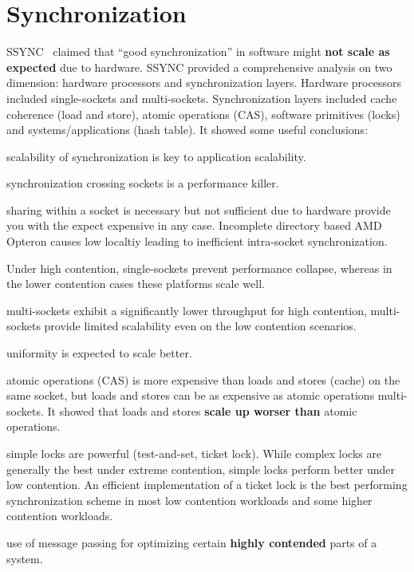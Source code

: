 \documentclass[UTF8,12pt,a4paper]{article}
\begin{document}
\section{Synchronization}
SSYNC~\cite{DBLP:conf/sosp/DavidGT13} claimed that
``good synchronization'' in software might \textbf{not scale as expected} due to hardware.
SSYNC provided a comprehensive analysis on two dimension:
hardware processors and synchronization layers.
Hardware processors included single-sockets and multi-sockets.
Synchronization layers included cache coherence (load and store),
atomic operations (CAS), software primitives (locks)
and systems/applications (hash table).
It showed some useful conclusions:
\begin{compactitem}
  \item scalability of synchronization is key to application scalability.
  \item synchronization crossing sockets is a performance killer.
  \item sharing within a socket is necessary but not sufficient
  due to hardware provide you with the expect expensive in any case.
  Incomplete directory based AMD Opteron causes low localtiy
  leading to inefficient intra-socket synchronization.
  \item Under high contention, single-sockets prevent performance collapse,
  whereas in the lower contention cases these platforms scale well.
  \item multi-sockets exhibit a significantly lower throughput for high contention,
  multi-sockets provide limited scalability even on the low contention scenarios.
  \item uniformity is expected to scale better.
  \item atomic operations (CAS) is more expensive than loads and stores (cache) on the same socket,
  but loads and stores can be as expensive as atomic operations multi-sockets.
  It showed that loads and stores \textbf{scale up worser than} atomic operations.
  \item simple locks are powerful (test-and-set, ticket lock).
  While complex locks are generally the best under extreme contention,
  simple locks perform better under low contention.
  An efficient implementation of a ticket lock is the best performing synchronization scheme
  in most low contention workloads and some higher contention workloads.
  \item use of message passing for optimizing certain \textbf{highly contended} parts of a system.
\end{compactitem}
\end{document}
